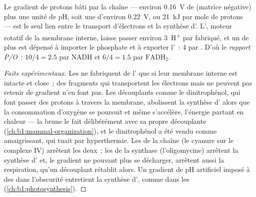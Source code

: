 \begin{theorem}\label{thm:b1:respiration-fermentation:chemiosmosis}
Le gradient de protons bâti par la chaîne --- environ \qty{0.16}{V} de
 (matrice négative) plus une unité de pH, soit une
\emph{} d'environ \qty{0.22}{V}, ou \qty{21}{kJ} par
mole de protons --- est le seul lien entre le transport d'électrons et
la synthèse d'. L', moteur rotatif de la membrane
interne, laisse passer environ \qty{3}{H^+} par  fabriqué, et un de
plus est dépensé à importer le phosphate et à exporter l'~: 4 par
. D'où le \emph{rapport P/O}~: $10/4 = 2.5$ 
par NADH et $6/4 = 1.5$ par $\mathrm{FADH_2}$.
\end{theorem}
\begin{proof}[Faits expérimentaux]
Les  ne fabriquent de l' que si leur membrane interne
est intacte et close~; des fragments qui transportent les électrons mais
ne peuvent pas retenir de gradient n'en font pas. Les découplants comme
le dinitrophénol, qui font passer des protons à travers la membrane,
abolissent la synthèse d' alors que la consommation d'oxygène se
poursuit et même s'accélère, l'énergie partant en chaleur --- la 
brune le fait délibérément avec sa propre  découplante
(\cref{ch:b1:mammal-organization}), et le dinitrophénol a été vendu comme
amaigrissant, qui tuait par hyperthermie. Les  de la chaîne
(le cyanure sur le complexe IV) arrêtent les deux~; les  de
la synthase (l'oligomycine) arrêtent la synthèse d' et, le gradient
ne pouvant plus se décharger, arrêtent aussi la respiration, qu'un
découplant rétablit alors. Un gradient de pH artificiel imposé à des
 dans l'obscurité entretient la synthèse d', comme dans
les  (\cref{ch:b1:photosynthesis}).
\end{proof}

